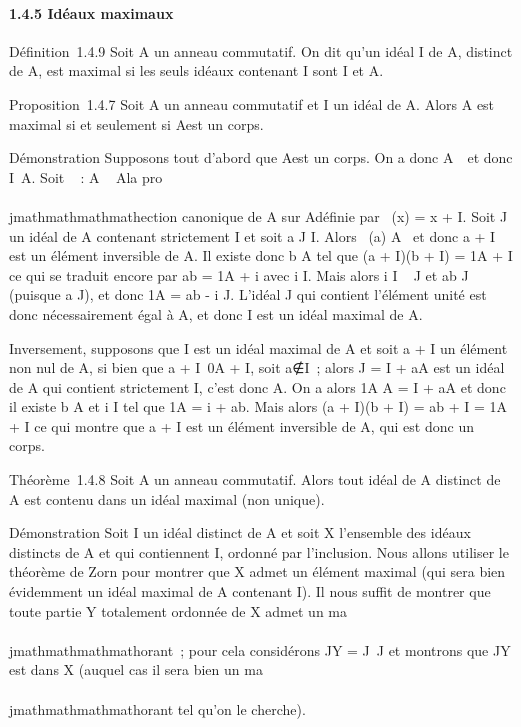\paragraph{1.4.5 Idéaux maximaux}

Définition~1.4.9 Soit A un anneau commutatif. On dit qu'un idéal I de A,
distinct de A, est maximal si les seuls idéaux contenant I sont I et A.

Proposition~1.4.7 Soit A un anneau commutatif et I un idéal de A. Alors
A est maximal si et seulement si A\diagupI est un corps.

Démonstration Supposons tout d'abord que A\diagupI est un corps. On a donc
A\diagupI\neq~\0\ et
donc I\neq~A. Soit \pi~ : A \rightarrow~ A\diagupI la pro\\\\jmathmathmathmathection
canonique de A sur A\diagupI définie par \pi~(x) = x + I. Soit J un idéal de A
contenant strictement I et soit a \in J \diagdown I. Alors \pi~(a) \in A\diagupI
\diagdown\0\ et donc a + I est un élément
inversible de A\diagupI. Il existe donc b \in A tel que (a + I)(b + I) =
1A + I ce qui se traduit encore par ab = 1A + i avec
i \in I. Mais alors i \in I \subset~ J et ab \in J (puisque a \in J), et donc
1A = ab - i \in J. L'idéal J qui contient l'élément unité est
donc nécessairement égal à A, et donc I est un idéal maximal de A.

Inversement, supposons que I est un idéal maximal de A et soit a + I un
élément non nul de A\diagupI, si bien que a +
I\neq~0A + I, soit
a∉I~; alors J = I + aA est un idéal de A qui
contient strictement I, c'est donc A. On a alors 1A \in A = I +
aA et donc il existe b \in A et i \in I tel que 1A = i + ab. Mais
alors (a + I)(b + I) = ab + I = 1A + I ce qui montre que a + I
est un élément inversible de A\diagupI, qui est donc un corps.

Théorème~1.4.8 Soit A un anneau commutatif. Alors tout idéal de A
distinct de A est contenu dans un idéal maximal (non unique).

Démonstration Soit I un idéal distinct de A et soit X l'ensemble des
idéaux distincts de A et qui contiennent I, ordonné par l'inclusion.
Nous allons utiliser le théorème de Zorn pour montrer que X admet un
élément maximal (qui sera bien évidemment un idéal maximal de A
contenant I). Il nous suffit de montrer que toute partie Y totalement
ordonnée de X admet un ma\\\\jmathmathmathmathorant~; pour cela considérons JY
= \⋃  J\inY~J
et montrons que JY est dans X (auquel cas il sera bien un
ma\\\\jmathmathmathmathorant tel qu'on le cherche).

